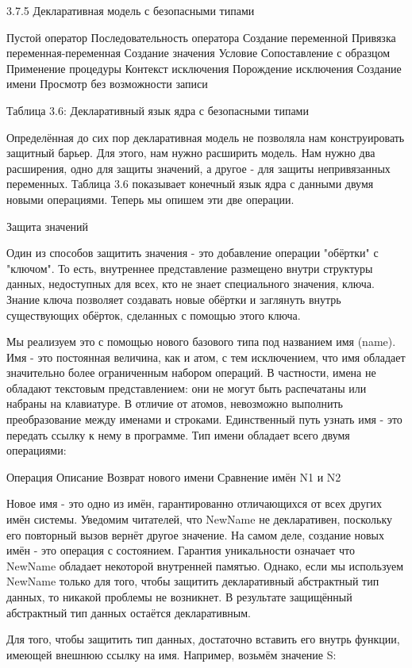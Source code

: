 3.7.5 Декларативная модель с безопасными типами

Пустой оператор
Последовательность оператора
Создание переменной
Привязка переменная-переменная
Создание значения
Условие
Сопоставление с образцом
Применение процедуры
Контекст исключения
Порождение исключения
Создание имени
Просмотр без возможности записи

Таблица 3.6: Декларативный язык ядра с безопасными типами

Определённая до сих пор декларативная модель не позволяла нам конструировать защитный барьер. Для этого, нам нужно расширить модель. Нам нужно два расширения, одно для защиты значений, а другое - для защиты непривязанных переменных. Таблица 3.6 показывает конечный язык ядра с данными двумя новыми операциями. Теперь мы опишем эти две операции.

Защита значений

Один из способов защитить значения - это добавление операции "обёртки" с "ключом". То есть, внутреннее представление размещено внутри структуры данных, недоступных для всех, кто не знает специального значения, ключа. Знание ключа позволяет создавать новые обёртки и заглянуть внутрь существующих обёрток, сделанных с помощью этого ключа.

Мы реализуем это с помощью нового базового типа под названием имя (name). Имя - это постоянная величина, как и атом, с тем исключением, что имя обладает значительно более ограниченным набором операций. В частности, имена не обладают текстовым представлением: они не могут быть распечатаны или набраны на клавиатуре. В отличие от атомов, невозможно выполнить преобразование между именами и строками. Единственный путь узнать имя - это передать ссылку к нему в программе. Тип имени обладает всего двумя операциями:

Операция
Описание
Возврат нового имени
Сравнение имён N1 и N2

Новое имя - это одно из имён, гарантированно отличающихся от всех других имён системы. Уведомим читателей, что NewName не декларативен, поскольку его повторный вызов вернёт другое значение. На самом деле, создание новых имён - это операция с состоянием. Гарантия уникальности означает что NewName обладает некоторой внутренней памятью. Однако, если мы используем NewName только для того, чтобы защитить декларативный абстрактный тип данных, то никакой проблемы не возникнет. В результате защищённый абстрактный тип данных остаётся декларативным.

Для того, чтобы защитить тип данных, достаточно вставить его внутрь функции, имеющей внешнюю ссылку на имя. Например, возьмём значение S:

